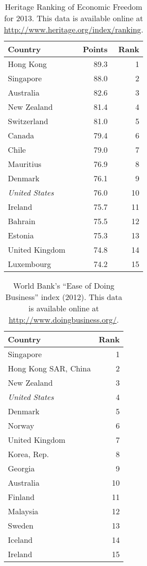 \begin{table}
\centering
\begin{tabular}{lrr}
\toprule
Country & Points & Rank \\
\midrule
Hong Kong             & 89.3 &  1 \\
Singapore             & 88.0 &  2 \\
Australia             & 82.6 &  3 \\
New Zealand           & 81.4 &  4 \\
Switzerland           & 81.0 &  5 \\
Canada                & 79.4 &  6 \\
Chile                 & 79.0 &  7 \\
Mauritius             & 76.9 &  8 \\
Denmark               & 76.1 &  9 \\
\emph{United States}  & 76.0 & 10 \\
Ireland               & 75.7 & 11 \\
Bahrain               & 75.5 & 12 \\
Estonia               & 75.3 & 13 \\
United Kingdom        & 74.8 & 14 \\
Luxembourg            & 74.2 & 15 \\
\bottomrule
\end{tabular}
\caption{Heritage Ranking of Economic Freedom for 2013. This data is available
online at \url{http://www.heritage.org/index/ranking}.}
\label{tab:heritage}
\end{table}

\begin{table}
\centering
\begin{tabular}{lr}
\toprule
Country & Rank \\
\midrule
Singapore & 1 \\
Hong Kong SAR, China & 2 \\
New Zealand & 3 \\
\emph{United States} & 4 \\
Denmark & 5 \\
Norway & 6 \\
United Kingdom & 7 \\
Korea, Rep. & 8 \\
Georgia & 9 \\
Australia & 10 \\
Finland & 11 \\
Malaysia & 12 \\
Sweden & 13 \\
Iceland & 14 \\
Ireland & 15 \\
\bottomrule
\end{tabular}
\caption{World Bank's ``Ease of Doing Business'' index (2012). This data is
available online at \url{http://www.doingbusiness.org/}.}
\label{tab:ease-of-doing-business}
\end{table}


